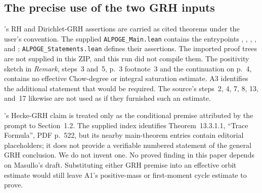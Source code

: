 \subsection*{The precise use of the two GRH inputs}
\citet{Alpoge26}'s RH and Dirichlet-GRH assertions are carried as cited theorems under the user's convention. The supplied \texttt{ALPOGE\_Main.lean} contains the entrypoints , , , , and ; \texttt{ALPOGE\_Statements.lean} defines their assertions. The imported proof trees are not supplied in this ZIP, and this run did not compile them. The positivity sketch in \emph{Remark}, steps~3 and~5, p.~3 footnote~3 and the continuation on p.~4, contains no effective Chow-degree or integral saturation estimate. A3 identifies the additional statement that would be required. The source's steps~2, 4, 7, 8, 13, and~17 likewise are not used as if they furnished such an estimate.

\citet{Masullo26}'s Hecke-GRH claim is treated only as the conditional premise attributed by the prompt to Section~1.2. The supplied index identifies Theorem~13.3.1.1, ``Trace Formula'', PDF p.~522, but its nearby main-theorem entries contain editorial placeholders; it does not provide a verifiable numbered statement of the general GRH conclusion. We do not invent one. No proved finding in this paper depends on Masullo's draft. Substituting either GRH premise into an effective orbit estimate would still leave A1's positive-mass or first-moment cycle estimate to prove.




